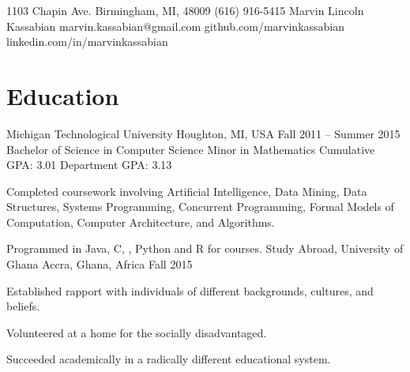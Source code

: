 \documentclass{marvinkassabian_resume}
\begin{document}
	\resumeheader
			{1103 Chapin Ave.}
			{Birmingham, MI, 48009}
			{(616) 916-5415}
			{Marvin Lincoln Kassabian}
			{marvin.kassabian@gmail.com}
			{github.com/marvinkassabian}
			{linkedin.com/in/marvinkassabian}
	\section{Education}
		\subsectionlocationdate	
				{Michigan Technological University}
				{Houghton, MI, USA}
				{Fall 2011 – Summer 2015}
		\educationextra
				{Bachelor of Science in Computer Science}
				{Minor in Mathematics}
				{Cumulative GPA: 3.01}
				{Department GPA: 3.13}
			\resumesublistbegin
				\item Completed coursework involving Artificial Intelligence, Data Mining, Data Structures, Systems Programming,
Concurrent Programming, Formal Models of Computation, Computer Architecture, and Algorithms.
				\item Programmed in Java, C, \cpp, Python and R for courses.
			\resumesublistend
		\subsectionlocationdate
				{Study Abroad, University of Ghana}
				{Accra, Ghana, Africa}
				{Fall 2015}
			\resumesublistbegin
				\item Established rapport with individuals of different backgrounds, cultures, and beliefs.
				\item Volunteered at a home for the socially disadvantaged.
				\item Succeeded academically in a radically different educational system.
			\resumesublistend
\end{document}
